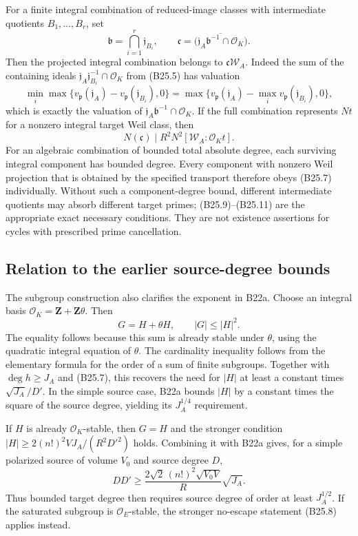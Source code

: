 \documentclass[11pt,a4paper]{article}
\theoremstyle{definition}
\begin{document}
For a finite integral combination of reduced-image classes with intermediate quotients \(B_1,\ldots,B_r\), set \[
 \mathfrak b=\bigcap_{i=1}^r\mathfrak j_{B_i},
 \qquad
 \mathfrak c=\overline{\bigl(\mathfrak j_A\mathfrak b^{-1}
                                      \cap\mathcal O_K\bigr)}.
\tag{B25.10}
\] Then the projected integral combination belongs to \(\mathfrak c\mathscr W_A\). Indeed the sum of the containing ideals \(\mathfrak j_A\mathfrak j_{B_i}^{-1}\cap\mathcal O_K\) from (B25.5) has valuation \[
 \min_i\max\{v_{\mathfrak p}(\mathfrak j_A)
                    -v_{\mathfrak p}(\mathfrak j_{B_i}),0\}
 =\max\{v_{\mathfrak p}(\mathfrak j_A)
                    -\max_i v_{\mathfrak p}(\mathfrak j_{B_i}),0\},
\] which is exactly the valuation of \(\mathfrak j_A\mathfrak b^{-1}\cap\mathcal O_K\). If the full combination represents \(Nt\) for a nonzero integral target Weil class, then \[
 N(\mathfrak c)\mid R^2N^2[\mathscr W_A:\mathcal O_Kt].
\tag{B25.11}
\] For an algebraic combination of bounded total absolute degree, each surviving integral component has bounded degree. Every component with nonzero Weil projection that is obtained by the specified transport therefore obeys (B25.7) individually. Without such a component-degree bound, different intermediate quotients may absorb different target primes; (B25.9)--(B25.11) are the appropriate exact necessary conditions. They are not existence assertions for cycles with prescribed prime cancellation.

\subsection{Relation to the earlier source-degree bounds}\label{relation-to-the-earlier-source-degree-bounds}

The subgroup construction also clarifies the exponent in B22a. Choose an integral basis \(\mathcal O_K=\mathbf Z+\mathbf Z\theta\). Then \[
 G=H+\theta H,\qquad |G|\le|H|^2.
\tag{B25.12}
\] The equality follows because this sum is already stable under \(\theta\), using the quadratic integral equation of \(\theta\). The cardinality inequality follows from the elementary formula for the order of a sum of finite subgroups. Together with \(\deg h\ge J_A\) and (B25.7), this recovers the need for \(|H|\) at least a constant times \(\sqrt{J_A}/D'\). In the simple source case, B22a bounds \(|H|\) by a constant times the square of the source degree, yielding its \(J_A^{1/4}\) requirement.

If \(H\) is already \(\mathcal O_K\)-stable, then \(G=H\) and the stronger condition \(|H|\ge 2(n!)^2VJ_A/(R^2D'^2)\) holds. Combining it with B22a gives, for a simple polarized source of volume \(V_0\) and source degree \(D\), \[
 DD'\ge\frac{2\sqrt2\,(n!)^2\sqrt{V_0V}}{R}\sqrt{J_A}.
\tag{B25.13}
\] Thus bounded target degree then requires source degree of order at least \(J_A^{1/2}\). If the saturated subgroup is \(\mathcal O_E\)-stable, the stronger no-escape statement (B25.8) applies instead.
\end{document}
